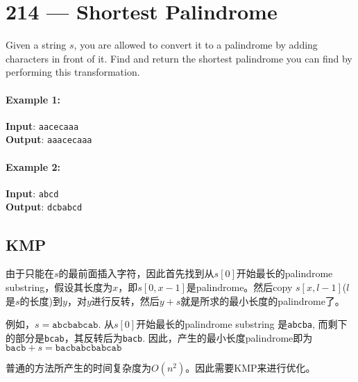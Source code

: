 \section{214 --- Shortest Palindrome}
Given a string $s$, you are allowed to convert it to a palindrome by adding characters in front of it. Find and return the shortest palindrome you can find by performing this transformation.
\paragraph{Example 1:}
\begin{flushleft}
\textbf{Input}: \texttt{aacecaaa}
\\
\textbf{Output}: \texttt{aaacecaaa}
\end{flushleft}
\paragraph{Example 2:}
\begin{flushleft}
\textbf{Input}: \texttt{abcd}
\\
\textbf{Output}: \texttt{dcbabcd}
\end{flushleft}
\subsection{KMP}
由于只能在$s$的最前面插入字符，因此首先找到从$s[0]$开始最长的palindrome substring，假设其长度为$x$，即$s[0,x-1]$是palindrome。然后copy $s[x,l-1]$($l$是$s$的长度)到$y$，对$y$进行反转，然后$y+s$就是所求的最小长度的palindrome了。
\par
例如，$s=\texttt{abcbabcab}$. 从$s[0]$开始最长的palindrome substring 是\texttt{abcba}, 而剩下的部分是\texttt{bcab}，其反转后为\texttt{bacb}. 因此，产生的最小长度palindrome即为$\texttt{bacb} + s = \texttt{bacbabcbabcab}$
\par
普通的方法所产生的时间复杂度为$O(n^2)$。因此需要KMP来进行优化。

